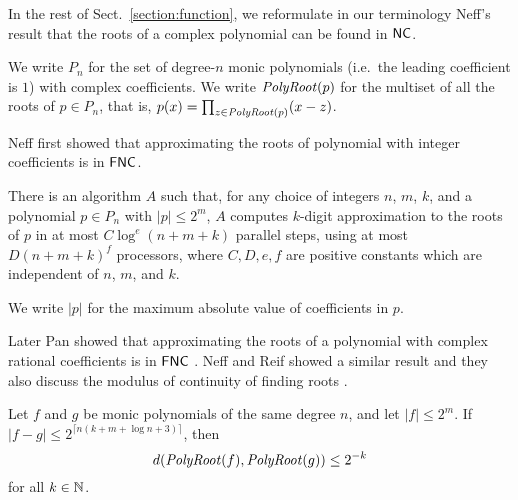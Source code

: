 \documentclass[envcountsect,envcountsame,orivec,oribibl]{llncs}
\begin{document}
In the rest of Sect.~\ref{section:function}, 
we reformulate in our terminology Neff's result that 
the roots of a complex polynomial can be found in $\mathsf{NC}$. 

We write $P_n$ for the set of degree-$n$ monic 
polynomials (i.e.\ the leading coefficient is $1$) with complex coefficients.
We write $\mathit{PolyRoot}(p)$ for the multiset of all the roots of $p \in P_n$, that is, $p(x) = \prod_{z \in \mathit{PolyRoot}(p)} (x - z)$. 

Neff first showed that approximating the roots of polynomial
with integer coefficients is in $\mathsf{FNC}$.
\begin{theorem}
\label{theorem:neff1994}
There is an algorithm $A$ such that,
for any choice of integers $n$, $m$, $k$, and a polynomial $p \in P_n$
with $|p| \le 2^m$,
$A$ computes $k$-digit approximation to the roots of $p$ 
in at most $C \log^e(n + m + k)$ parallel steps, 
using at most $D(n + m + k)^f$ processors, where $C, D, e, f$ are positive
constants which are independent of $n$, $m$, and $k$.
\end{theorem}
We write $|p|$ for the maximum absolute value
 of coefficients in $p$.

Later Pan showed that approximating the roots of a polynomial
with complex rational coefficients is in $\mathsf{FNC}$ \cite{pan1995optimal}.
Neff and Reif showed a similar result and they also discuss
the modulus of continuity of finding roots \cite{neff1996efficient}.

\begin{theorem}
\label{neff1996modulus}
 Let $f$ and $g$ be monic polynomials of the same degree $n$,
 and let $|f| \le 2^m$.
 If $|f - g| \le 2^{\lceil n(k + m + \log n + 3)\rceil}$, then
 \begin{equation}
  d(\mathit{PolyRoot}(f), \mathit{PolyRoot}(g)) \le 2^{-k} 
 \end{equation}
 for all $k \in \mathbb N$.
\end{theorem}

\end{document}
